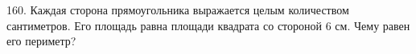 160. Каждая сторона прямоугольника выражается целым количеством сантиметров. Его площадь равна площади квадрата со стороной 6 см. Чему равен его периметр?\\
